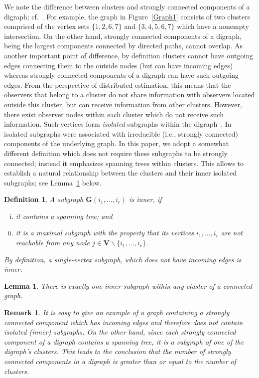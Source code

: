 \documentclass[a4paper,10pt,conference]{ieeeconf}
\newtheorem{definition}{Definition}
\newtheorem{remark}{Remark}
\newtheorem{lemma}{Lemma}
\begin{document}
We note the
difference between clusters and strongly connected components of a
digraph; cf.~\cite{FFS-2010}. For example, the graph in
Figure~\ref{Graph1} consists of two 
clusters comprised of the vertex sets $\{1,2,6,7\}$ and
$\{3,4,5,6,7\}$ which have a nonempty intersection. On the other hand,
strongly connected components of a
digraph, being the largest components connected by directed paths,
cannot overlap. As another important point of difference, by definition clusters
cannot have outgoing edges connecting them to the outside nodes
(but can have incoming edges) whereas 
strongly connected components of a digraph can have such outgoing edges.
From the perspective of distributed estimation, this means that the
observers that belong to a cluster do not 
share information with observers located outside this cluster, but can receive
information from other clusters. However, there exist 
observer nodes within each cluster which do not receive such
information. Such vertices form \emph{isolated} subgraphs within
the digraph~\cite{FFS-2010}. In~\cite{FFS-2010} isolated subgraphs were
associated with irreducible (i.e., strongly connected) components of the
underlying graph. In this paper, we adopt a somewhat different definition
which does not require these
subgraphs to be strongly connected; instead it emphasizes spanning trees
within clusters. This allows to establish a natural relationship between
the clusters and their inner isolated subgraphs; see Lemma~\ref{inner.prop}
below. 

\begin{definition}\label{inner-cluster}
A subgraph $\mathbf{G}(i_1,\ldots,i_r)$ is \emph{inner}, if 
\begin{enumerate}[(i)]
\item
it contains a spanning tree; and
\item   
it is a maximal subgraph with the property that its vertices $i_1,\ldots,i_r$
are not reachable from any node $j\in\mathbf{V}\backslash 
\{i_1,\ldots,i_r\}$.
\end{enumerate}   
By definition, a single-vertex subgraph, which does not have incoming edges
is inner. 
\end{definition}

\begin{lemma}\label{inner.prop}
There is exactly one inner subgraph within any cluster of a
connected graph. 
\end{lemma}


\begin{remark}
It is easy to give an example of a graph containing a strongly connected
component which has incoming edges and therefore does not contain isolated
(inner) 
subgraphs. On the other hand, 
since each strongly connected component of a digraph contains a spanning
tree, it is a subgraph of one of the digraph's clusters. This leads to the
conclusion that the number of strongly connected components in a digraph is
greater than or equal to the number of clusters. 
\end{remark}
\end{document}
